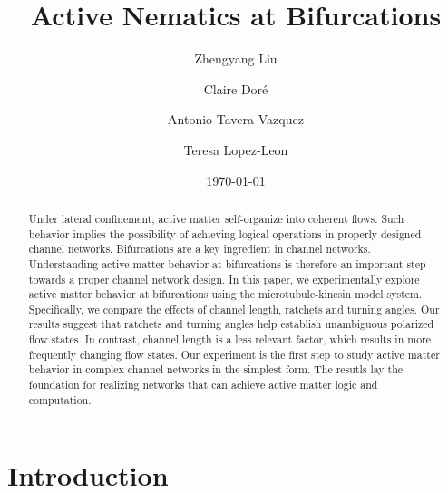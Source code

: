 \documentclass[%
10pt,
superscriptaddress,
twocolumn,
 amsmath,amssymb,
 aps,prx,
]{revtex4-2}
\begin{document}

\title{Active Nematics at Bifurcations}%

\author{Zhengyang Liu}
\author{Claire Doré}

\author{Antonio Tavera-Vazquez}

\author{Teresa Lopez-Leon}
\date{\today}


\begin{abstract}

Under lateral confinement, active matter self-organize into coherent flows. 
Such behavior implies the possibility of achieving logical operations in properly designed channel networks. 
Bifurcations are a key ingredient in channel networks.
Understanding active matter behavior at bifurcations is therefore an important step towards a proper channel network design.
In this paper, we experimentally explore active matter behavior at bifurcations using the microtubule-kinesin model system. 
Specifically, we compare the effects of channel length, ratchets and turning angles. 
Our results suggest that ratchets and turning angles help establish unambiguous polarized flow states.
In contrast, channel length is a less relevant factor, which results in more frequently changing flow states.
Our experiment is the first step to study active matter behavior in complex channel networks in the simplest form.
The resutls lay the foundation for realizing networks that can achieve active matter logic and computation.

\end{abstract}


\maketitle

\section{Introduction}
\end{document}
